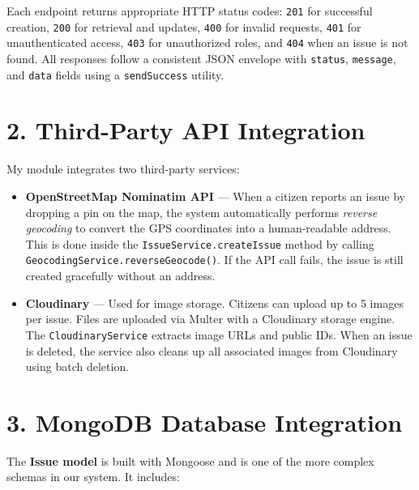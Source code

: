 \documentclass[12pt,a4paper]{article}
\begin{document}
Each endpoint returns appropriate HTTP status codes: \texttt{201} for successful creation, \texttt{200} for retrieval and updates, \texttt{400} for invalid requests, \texttt{401} for unauthenticated access, \texttt{403} for unauthorized roles, and \texttt{404} when an issue is not found. All responses follow a consistent JSON envelope with \texttt{status}, \texttt{message}, and \texttt{data} fields using a \texttt{sendSuccess} utility.

\section{2. Third-Party API Integration}

My module integrates two third-party services:

\begin{itemize}[nosep]
    \item \textbf{OpenStreetMap Nominatim API} --- When a citizen reports an issue by dropping a pin on the map, the system automatically performs \emph{reverse geocoding} to convert the GPS coordinates into a human-readable address. This is done inside the \texttt{IssueService.createIssue} method by calling \texttt{GeocodingService.reverseGeocode()}. If the API call fails, the issue is still created gracefully without an address.
    \item \textbf{Cloudinary} --- Used for image storage. Citizens can upload up to 5 images per issue. Files are uploaded via Multer with a Cloudinary storage engine. The \texttt{CloudinaryService} extracts image URLs and public IDs. When an issue is deleted, the service also cleans up all associated images from Cloudinary using batch deletion.
\end{itemize}

\section{3. MongoDB Database Integration}

The \textbf{Issue model} is built with Mongoose and is one of the more complex schemas in our system. It includes:
\end{document}
